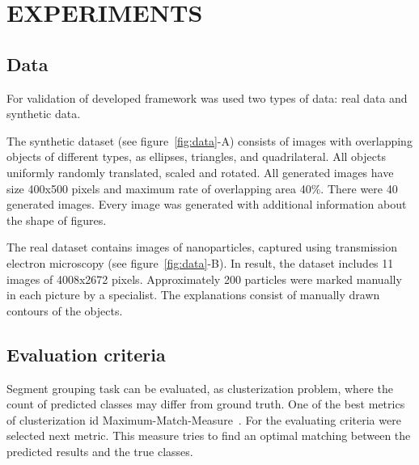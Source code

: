 \documentclass{lutmscthesis}[2010/09/22]
\begin{document}
\section{EXPERIMENTS}
\label{sec:experiments}

\subsection{Data}
For validation of developed framework was used two types of data: real data and synthetic data.
 
The synthetic dataset (see figure~\ref{fig:data}-A) consists of images with overlapping
objects of different types, as ellipses, triangles, and quadrilateral. All objects uniformly randomly translated, scaled and rotated. All generated images have size 400x500 pixels and maximum rate of overlapping area 40\%. There were 40 generated images. Every image was generated with additional information about the shape of figures.

The real dataset contains images of nanoparticles, captured
using transmission electron microscopy (see figure~\ref{fig:data}-B). In result, the dataset includes 11 images of 4008x2672 pixels. Approximately 200 particles were marked manually in each picture by a specialist. The explanations consist of manually drawn contours of the objects. 

\begin{figure}[htp]
\end{figure}

\subsection{Evaluation criteria}
Segment grouping task can be evaluated, as clusterization problem, where the count of predicted classes may differ from ground truth. One of the best metrics of clusterization id Maximum-Match-Measure~\cite{mm-estimate}. For the evaluating criteria were selected next metric. This measure tries to find an optimal matching between the predicted results and the true classes.
\end{document}
